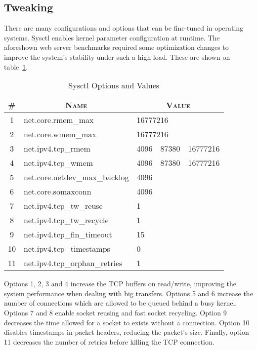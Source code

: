 \subsection{Tweaking}
There are many configurations and options that can be fine-tuned in operating systems. Sysctl enables kernel parameter configuration at runtime. The aforeshown web server benchmarks required some optimization changes to improve the system's stability under such a high-load. These are shown on table~\ref{tab:sysctl}.
\begin{table}[ht]
  \centering
  \caption{Sysctl Options and Values}
  \label{tab:sysctl}
  
  \begin{tabular}{c|p{}|p{}}
  \multicolumn{1}{c|}{\textbf{\textsc{\#}}} & \multicolumn{1}{c|}{\textbf{\textsc{Name}}} & \multicolumn{1}{c}{\textbf{\textsc{Value}}} \\ \hline
  
  1 & net.core.rmem\_max & 16777216 \\ \hline
  2 & net.core.wmem\_max & 16777216 \\ \hline
  3 & net.ipv4.tcp\_rmem & 4096~\, 87380~\, 16777216 \\ \hline
  4 & net.ipv4.tcp\_wmem & 4096~\, 87380~\, 16777216 \\ \hline
  5 & net.core.netdev\_max\_backlog & 4096 \\ \hline
  6 & net.core.somaxconn & 4096 \\ \hline
  7 & net.ipv4.tcp\_tw\_reuse & 1 \\ \hline
  8 & net.ipv4.tcp\_tw\_recycle & 1 \\ \hline
  9 & net.ipv4.tcp\_fin\_timeout & 15 \\ \hline
  10 & net.ipv4.tcp\_timestamps & 0 \\ \hline
  11 & net.ipv4.tcp\_orphan\_retries & 1 \\
  
  \end{tabular}
\end{table}
Options 1, 2, 3 and 4 increase the TCP buffers on read/write, improving the system performance when dealing with big transfers. Options 5 and 6 increase the number of connections which are allowed to be queued behind a busy kernel. Options 7 and 8 enable socket reusing and fast socket recycling. Option 9 decreases the time allowed for a socket to exists without a connection. Option 10 disables timestamps in packet headers, reducing the packet's size. Finally, option 11 decreases the number of retries before killing the TCP connection.

